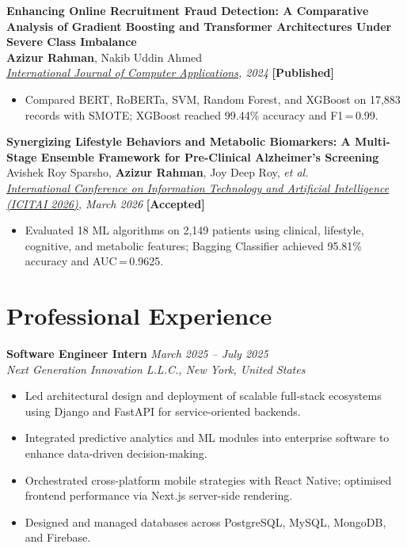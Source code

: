 \documentclass[11pt, letterpaper]{article}
\newcommand{\pubentry}[4]{%
  \noindent\textbf{#1}\\[1pt]
  \noindent #2\\[1pt]
  \noindent\textit{#3} \hfill \textbf{[#4]}\\[4pt]
}
\begin{document}
\vspace{6pt}

\pubentry
  {Enhancing Online Recruitment Fraud Detection: A Comparative Analysis of
   Gradient Boosting and Transformer Architectures Under Severe Class Imbalance}
  {\textbf{Azizur Rahman}, Nakib Uddin Ahmed}
  {\href{https://www.ijcaonline.org/archives/volume187/number91/enhancing-online-recruitment-fraud-detection-a-comparative-analysis-of-gradient-boosting-and-transformer-architectures-under-severe-class-imbalance/}{\underline{International Journal of Computer Applications}}, 2024}
  {Published}

\begin{itemize}
  \item Compared BERT, RoBERTa, SVM, Random Forest, and XGBoost on 17,883 records with
        SMOTE; XGBoost reached 99.44\% accuracy and F1\,=\,0.99.
\end{itemize}

\vspace{6pt}

\pubentry
  {Synergizing Lifestyle Behaviors and Metabolic Biomarkers: A Multi-Stage
   Ensemble Framework for Pre-Clinical Alzheimer's Screening}
  {Avishek Roy Sparsho, \textbf{Azizur Rahman}, Joy Deep Roy, \textit{et al.}}
  {\href{https://scrs.in/conference/icitai2026/page/ITAI_2026_Program_Schedule}{\underline{International Conference on Information Technology and Artificial Intelligence (ICITAI 2026)}}, March 2026}
  {Accepted}

\begin{itemize}
  \item Evaluated 18 ML algorithms on 2,149 patients using clinical, lifestyle, cognitive,
        and metabolic features; Bagging Classifier achieved 95.81\% accuracy and
        AUC\,=\,0.9625.
\end{itemize}

\section{Professional Experience}

\noindent\textbf{Software Engineer Intern} \hfill \textit{March 2025 – July 2025}\\
\textit{Next Generation Innovation L.L.C., New York, United States}
\begin{itemize}
  \item Led architectural design and deployment of scalable full-stack ecosystems
        using Django and FastAPI for service-oriented backends.
  \item Integrated predictive analytics and ML modules into enterprise software to
        enhance data-driven decision-making.
  \item Orchestrated cross-platform mobile strategies with React Native; optimised
        frontend performance via Next.js server-side rendering.
  \item Designed and managed databases across PostgreSQL, MySQL, MongoDB, and Firebase.
\end{itemize}
\end{document}
